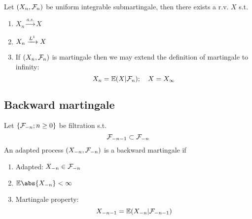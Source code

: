 \newpage
\begin{thm}
Let $(X_n, \mathcal{F}_n)$ be uniform integrable submartingale, then there exists a r.v. $X$ s.t.\begin{enumerate}
    \item $X_n \xrightarrow{a.s.} X$
    \item $X_n \xrightarrow{L^{1}} X$
    \item If $(X_n, \mathcal{F}_n)$ is martingale then we may extend the definition of martingale to infinity: \begin{equation*}
        X_n = \mathbb{E}(X|\mathcal{F}_n); \quad X = X_\infty
    \end{equation*}
\end{enumerate}
\end{thm}
\pf
\newpage
\subsection{Backward martingale}
Let $\{\mathcal{F}_{-n}; n\geq 0\}$ be filtration s.t. \begin{equation*}
    \mathcal{F}_{-n-1} \subset \mathcal{F}_{-n} 
\end{equation*} An adapted process $(X_{-n}, \mathcal{F}_{-n})$ is a backward martingale if \begin{enumerate}
    \item Adapted: $X_{-n} \in \mathcal{F}_{-n}$
    \item $\E\abs{X_{-n}} <\infty$
    \item Martingale property: 
    \begin{equation*}
        X_{-n-1} = \mathbb{E}(X_{-n}|\mathcal{F}_{-n-1})
    \end{equation*}
\end{enumerate}

